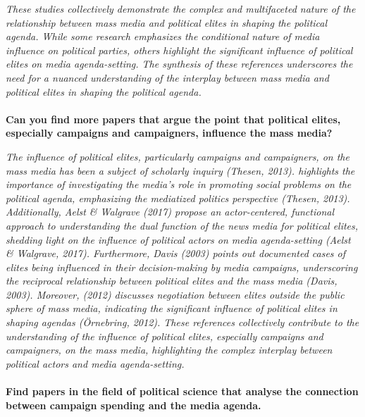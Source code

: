 \documentclass[11pt,a4paper]{article}
\begin{document}
 \textit{These studies collectively demonstrate the complex and multifaceted nature of the relationship between mass media and political elites in shaping the political agenda. While some research emphasizes the conditional nature of media influence on political parties, others highlight the significant influence of political elites on media agenda-setting. The synthesis of these references underscores the need for a nuanced understanding of the interplay between mass media and political elites in shaping the political agenda.}
\\
\\
 \textbf{Can you find more papers that argue the point that political elites, especially campaigns and campaigners, influence the mass media?}

\textit{The influence of political elites, particularly campaigns and campaigners, on the mass media has been a subject of scholarly inquiry (Thesen, 2013). highlights the importance of investigating the media's role in promoting social problems on the political agenda, emphasizing the mediatized politics perspective (Thesen, 2013). Additionally, Aelst \& Walgrave (2017) propose an actor-centered, functional approach to understanding the dual function of the news media for political elites, shedding light on the influence of political actors on media agenda-setting (Aelst \& Walgrave, 2017). Furthermore, Davis (2003) points out documented cases of elites being influenced in their decision-making by media campaigns, underscoring the reciprocal relationship between political elites and the mass media (Davis, 2003). Moreover, (2012) discusses negotiation between elites outside the public sphere of mass media, indicating the significant influence of political elites in shaping agendas (Örnebring, 2012). These references collectively contribute to the understanding of the influence of political elites, especially campaigns and campaigners, on the mass media, highlighting the complex interplay between political actors and media agenda-setting.}
\\
\\
 \textbf{Find papers in the field of political science that analyse the connection between campaign spending and the media agenda.}
\end{document}
